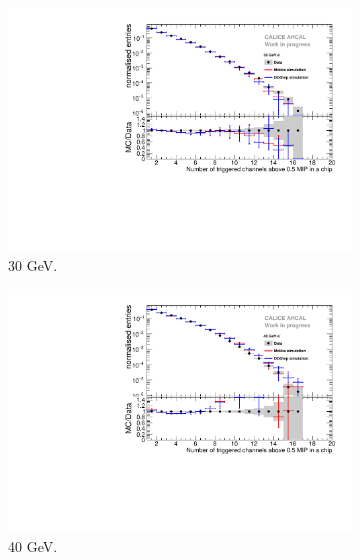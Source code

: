 \begin{figure}[htbp!]
\begin{subfigure}[t]{0.49\textwidth}
    \includegraphics[width=1\textwidth]{../Thesis_Plots/Timing/Electrons/Plots/Comparison_SimData_Electrons_nHits_30GeV.pdf}
    \caption{30 GeV.}\label{fig:elec_sim_data_nHits_30GeV}
  \end{subfigure}
  \hfill
  \begin{subfigure}[t]{0.49\textwidth}
    \centering
    \includegraphics[width=1\textwidth]{../Thesis_Plots/Timing/Electrons/Plots/Comparison_SimData_Electrons_nHits_40GeV.pdf}
    \caption{40 GeV.}\label{fig:elec_sim_data_nHits_40GeV}
  \end{subfigure}
  \hfill
  \begin{subfigure}[t]{0.49\textwidth}
    \centering

\end{subfigure}
\end{figure}
